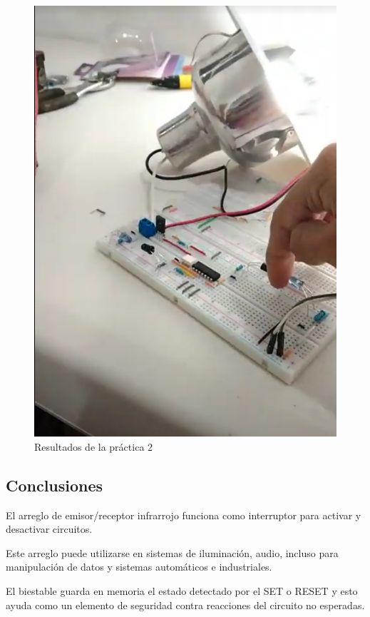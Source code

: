 \begin{figure}[h]
    \centering
    \includegraphics[scale=0.4]{media/Resultados2.png}
    \caption{Resultados de la práctica 2}
    \label{Fig: Resultados de la practica 2}
\end{figure}

\subsection{Conclusiones}

El arreglo de emisor/receptor infrarrojo funciona como interruptor para activar y desactivar circuitos.

Este arreglo puede utilizarse en sistemas de iluminación, audio, incluso para manipulación de datos y sistemas automáticos 
e industriales.

El biestable guarda en memoria el estado detectado por el SET o RESET y esto ayuda como un elemento de seguridad contra
reacciones del circuito no esperadas.
